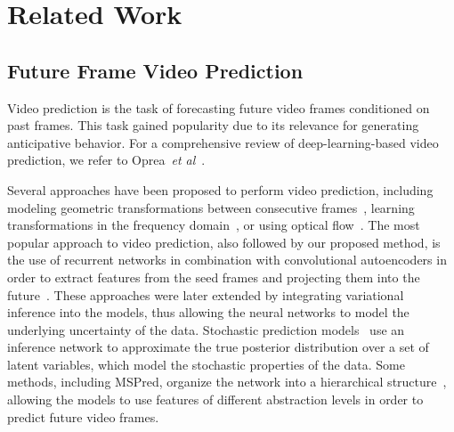 \documentclass{bmvc2k}
\def\etal{\emph{et al}\bmvaOneDot}
\begin{document}
\vspace{-0.2cm}
\section{Related Work}

\subsection{Future Frame Video Prediction}

Video prediction is the task of forecasting future video frames conditioned on past frames.
This task gained popularity due to its relevance for generating anticipative behavior.
For a comprehensive review of deep-learning-based video prediction, we refer to Oprea~\etal~\cite{Oprea_VideoPredictionReview_2020}.

Several approaches have been proposed to perform video prediction, including modeling  geometric transformations between consecutive frames~\cite{Michalski_ModelingDeepTemporalDependenciesPGP_2014, Jia_DynamicFilterNetworks_2016}, learning transformations in the frequency domain~\cite{Farazi_MotionSegmentationUsingFrequencyDomainTransformerNetworks_2020,Farazi_LocalFrequencyDomainTransformerNwtworksForVideoPrediction_2021}, or using optical flow~\cite{Patraucean_SpatioTemporalVideoAutoencoderWithDifferentiableMemory_2016, Li_FlowGroundedSpatialTemporalVideoPredictionFromStillImages_2018}.
The most popular approach to video prediction, also followed by our proposed method, is the use of recurrent networks in combination with convolutional autoencoders in order to extract features from the seed frames and projecting them into the future~\cite{Srivastava_UnsupervisedLeaerningOfVideoRepresentationsUsingLSTMs_2015, Shi_ConvLSTMNetworkPrecipitationNowcasting_2015, Wang_PredRNN_2017, Wang_PredRNN_2021, Shi_DeepLearningForPrecipitationNowcastingBenchamrkAndModel_2017, Guen_DisentanglingPhysiscalDynamicsFromUnknownFactorsForVideoPrediction_2020, Akan_SlampStochasticLatentAppearanceAndMotionPrediction_2021}.
These approaches were later extended by integrating variational inference into the models, thus allowing the neural networks to model the underlying uncertainty of the data.
Stochastic prediction models~\cite{Babaeizadeh_StochasticVariationalVideoPrediction_2018,Denton_StochasticVideoGenerationWithALearnedPrior_2018,Castrejon_ImprovedVRNNsForVideoPrediction_2019} use an inference network to approximate the true posterior distribution over a set of latent variables, which model the stochastic properties of the data.
Some methods, including MSPred, organize the network into a hierarchical structure~\cite{Premont_RecurrentLadderNetworks_2017,Castrejon_ImprovedVRNNsForVideoPrediction_2019, Wu_GreedyHierarchicalVariationalAutoencoders_2021}, allowing the models to use features of different abstraction levels in order to predict future video frames.
\end{document}
